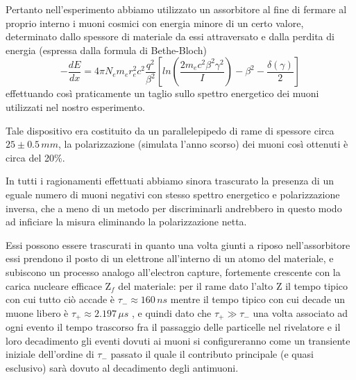 Pertanto nell'esperimento abbiamo utilizzato un assorbitore al fine di fermare al proprio interno i muoni cosmici con energia minore di un certo valore, determinato dallo spessore di materiale da essi attraversato e dalla perdita di energia (espressa dalla formula di Bethe-Bloch) 
$$-\frac{dE}{dx}=4\pi N_e m_e r_e^2 c^2 \frac{q^2}{\beta^2}[ln(\frac{2m_e c^2 \beta^2 \gamma^2}{I})-\beta^2-\frac{\delta(\gamma)}{2}]$$ 
effettuando così praticamente un taglio sullo spettro energetico dei muoni utilizzati nel nostro esperimento. \par
Tale dispositivo era costituito da un parallelepipedo di rame di spessore circa $25\pm0.5 \, mm$, la polarizzazione (simulata l'anno scorso) dei muoni così ottenuti è circa del 20\%. \par
In tutti i ragionamenti effettuati abbiamo sinora trascurato la presenza di un eguale numero di muoni negativi con stesso spettro energetico e polarizzazione inversa, che a meno di un metodo per discriminarli andrebbero in questo modo ad inficiare la misura eliminando la polarizzazione netta. \par
Essi possono essere trascurati in quanto una volta giunti a riposo nell'assorbitore essi prendono il posto di un elettrone all'interno di un atomo del materiale, e subiscono un  processo analogo all'electron capture, fortemente crescente con la carica nucleare efficace Z$_f$ del materiale: per il rame dato l'alto Z il tempo tipico con cui tutto ciò accade è $\tau_-\approx 160 \, ns$ \cite{bib:Suzuki:1987jf} mentre il tempo tipico con cui decade un muone libero è $\tau_+\approx 2.197 \, \mu s$ \cite{bib:Patrignani:2016xqp}, e quindi dato che $\tau_+\gg\tau_-$ una volta associato ad ogni evento il tempo trascorso fra il passaggio delle particelle nel rivelatore e il loro decadimento gli eventi dovuti ai muoni si configureranno come un transiente iniziale dell'ordine di $\tau_-$ passato il quale il contributo principale (e quasi esclusivo) sarà dovuto al decadimento degli antimuoni. \par

